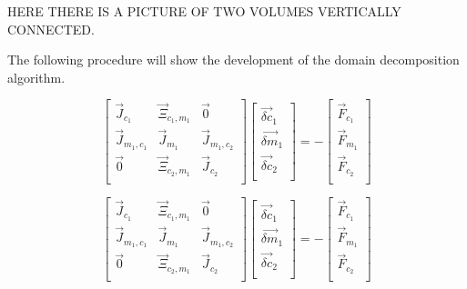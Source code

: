 HERE THERE IS A PICTURE OF TWO VOLUMES VERTICALLY CONNECTED.

The following procedure will show the development of the domain decomposition algorithm.

\begin{equation}
\label{eqn:domainMatrix}
 \begin{bmatrix} 
\vec{J}_{c_1} & \vec{\Xi}_{c_1,m_1} & \vec{0} \\
\vec{J}_{m_1,c_1} & \vec{J}_{m_1} & \vec{J}_{m_1,c_2}  \\
\vec{0} & \vec{\Xi}_{c_2,m_1} & \vec{J}_{c_2} \\
 \end{bmatrix} \begin{bmatrix}
 \vec{\delta c}_{1} \\
 \vec{\delta m}_{1} \\
 \vec{\delta c}_{2} \\
\end{bmatrix}  = -\begin{bmatrix}
 \vec{F}_{c_1} \\
 \vec{F}_{m_1} \\
 \vec{F}_{c_2} \\
\end{bmatrix}
 \end{equation}
 
 \begin{equation}
\label{eqn:domainMatrix2}
 \begin{bmatrix} 
\vec{J}_{c_1} & \vec{\Xi}_{c_1,m_1} & \vec{0} \\
\vec{J}_{m_1,c_1} & \vec{J}_{m_1} & \vec{J}_{m_1,c_2}  \\
\vec{0} & \vec{\Xi}_{c_2,m_1} & \vec{J}_{c_2} \\
 \end{bmatrix} \begin{bmatrix}
 \vec{\delta c}_{1} \\
 \vec{\delta m}_{1} \\
 \vec{\delta c}_{2} \\
\end{bmatrix}  = -\begin{bmatrix}
 \vec{F}_{c_1} \\
 \vec{F}_{m_1} \\
 \vec{F}_{c_2} \\
\end{bmatrix}
 \end{equation}

